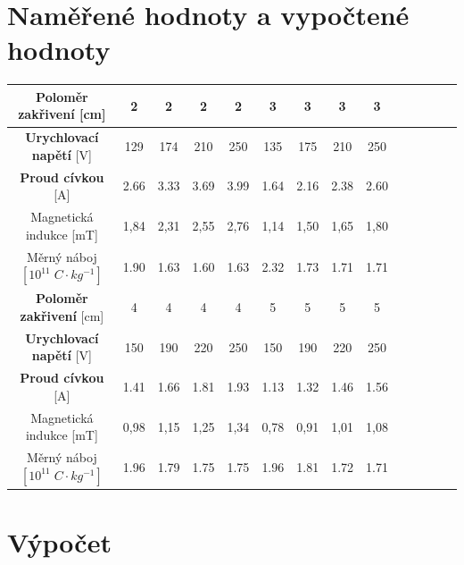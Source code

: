 \documentclass[11pt, a4paper]{report}
\begin{document}
\chapter{Naměřené hodnoty a vypočtené hodnoty}
\begin{center}
	\renewcommand{\arraystretch}{1.5}
	\begin{table}[h]
		\centering
		\begin{tabular}{|c|c|c|c|c|c|c|c|c|c|c|c|c|c|}
			\hline

			\textbf{Poloměr zakřivení } [cm]           & 2    & 2    & 2    & 2    & 3    & 3    & 3    & 3    \\
			\hline

			\textbf{Urychlovací napětí}  [V]           & 129  & 174  & 210  & 250  & 135  & 175  & 210  & 250  \\
			\hline
			\textbf{Proud cívkou} [A]                  & 2.66 & 3.33 & 3.69 & 3.99 & 1.64 & 2.16 & 2.38 & 2.60 \\
			\hline
			Magnetická indukce  [mT]                   & 1,84 & 2,31 & 2,55 & 2,76 & 1,14 & 1,50 & 1,65 & 1,80 \\
			\hline
			Měrný náboj $[10^{11}\;C \cdot kg^{-1} ]$  & 1.90 & 1.63 & 1.60 & 1.63 & 2.32 & 1.73 & 1.71 & 1.71 \\
			\hline
			\hline
			\textbf{Poloměr zakřivení} [cm]            & 4    & 4    & 4    & 4    & 5    & 5    & 5    & 5    \\
			\hline

			\textbf{Urychlovací napětí} [V]            & 150  & 190  & 220  & 250  & 150  & 190  & 220  & 250  \\
			\hline
			\textbf{Proud cívkou} [A]                  & 1.41 & 1.66 & 1.81 & 1.93 & 1.13 & 1.32 & 1.46 & 1.56 \\
			\hline
			Magnetická indukce [mT]                    & 0,98 & 1,15 & 1,25 & 1,34 & 0,78 & 0,91 & 1,01 & 1,08 \\
			\hline
			Měrný náboj $ [10^{11}\;C \cdot kg^{-1} ]$ & 1.96 & 1.79 & 1.75 & 1.75 & 1.96 & 1.81 & 1.72 & 1.71 \\
			\hline
		\end{tabular}
	\end{table}
\end{center}
\clearpage

\chapter{Výpočet}
\end{document}
